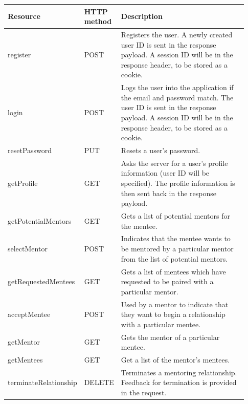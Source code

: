 \documentclass[10pt]{article}
\begin{document}
\begin{longtable}{|p{0.2\linewidth}|p{0.08\linewidth}|p{0.65\linewidth}|}
    \hline \textbf{Resource} & \textbf{HTTP method} & \textbf{Description} \\ \hline\hline
    register
    &
    POST
    &
    Registers the user. A newly created user ID is sent in the response payload. A session ID will be in the response header, to be stored as a cookie.
    \\ \hline

    login
    &
    POST
    &
    Logs the user into the application if the email and password match. The user ID is sent in the response payload. A session ID will be in the response header, to be stored as a cookie.
    \\ \hline

    resetPassword
    &
    PUT
    &
    Resets a user's password.
    \\ \hline

    getProfile
    &
    GET
    &
    Asks the server for a user's profile information (user ID will be specified). The profile information is then sent back in the response payload.
    \\ \hline

    getPotentialMentors
    &
    GET
    &
    Gets a list of potential mentors for the mentee.
    \\ \hline

    selectMentor
    &
    POST
    &
    Indicates that the mentee wants to be mentored by a particular mentor from the list of potential mentors.
    \\ \hline

    getRequestedMentees
    &
    GET
    &
    Gets a list of mentees which have requested to be paired with a particular mentor.
    \\ \hline

    acceptMentee
    &
    POST
    &
    Used by a mentor to indicate that they want to begin a relationship with a particular mentee.
    \\ \hline

    getMentor
    &
    GET
    &
    Gets the mentor of a particular mentee.
    \\ \hline

    getMentees
    &
    GET
    &
    Get a list of the mentor's mentees.
    \\ \hline

    terminateRelationship
    &
    DELETE
    &
    Terminates a mentoring relationship. Feedback for termination is provided in the request.
    \\ \hline


\end{longtable}
\end{document}
